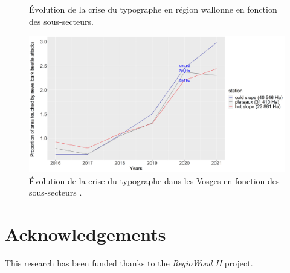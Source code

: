 \documentclass[3p,times]{elsarticle}
\begin{document}
\begin{figure}[htbp]
	\begin{minipage}[b]{1 \linewidth}
		\centering
		\caption{Évolution de la crise du typographe en région wallonne en fonction des sous-secteurs.}
		\label{fig:ss_wall}
	\end{minipage}\hfill
	\vspace{1cm}
	\begin{minipage}[b]{1 \linewidth}
		\centering
		\includegraphics[width=1\textwidth]{evol_ss_vosges.png}
		\caption{Évolution de la crise du typographe dans les Vosges en fonction des sous-secteurs .}
		\label{fig:ss_vosg}
	\end{minipage}
\end{figure}

\section{Acknowledgements}

This research has been funded thanks to the \textit{RegioWood II} project.



\end{document}
